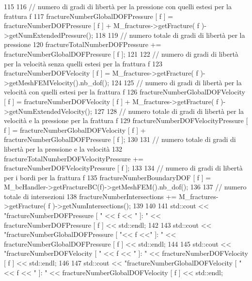 \begin{DoxyCode}
115         
116         \textcolor{comment}{// numero di gradi di libertà per la pressione con quelli estesi per la frattura f}
117         fractureNumberGlobalDOFPressure [ f ] = fractureNumberDOFPressure [ f ] + M\_fractures->getFracture(
       f )->getNumExtendedPressure();
118 
119         \textcolor{comment}{// numero totale di gradi di libertà per la pressione}
120         fractureTotalNumberDOFPressure += fractureNumberGlobalDOFPressure [ f ];
121 
122         \textcolor{comment}{// numero di gradi di libertà per la velocità senza quelli estesi per la frattura f}
123         fractureNumberDOFVelocity [ f ] = M\_fractures->getFracture( f )->getMeshFEMVelocity().nb\_dof();
124 
125         \textcolor{comment}{// numero di gradi di libertà per la velocità con quelli estesi per la frattura f}
126         fractureNumberGlobalDOFVelocity [ f ] = fractureNumberDOFVelocity [ f ] + M\_fractures->getFracture(
       f )->getNumExtendedVelocity();
127 
128         \textcolor{comment}{// numero totale di gradi di libertà per la velocità e la pressione per la frattura f}
129         fractureNumberDOFVelocityPressure [ f ] = fractureNumberGlobalDOFVelocity [ f ] + 
      fractureNumberGlobalDOFPressure [ f ];
130 
131         \textcolor{comment}{// numero totale di gradi di libertà per la pressione e la velocità}
132         fractureTotalNumberDOFVelocityPressure += fractureNumberDOFVelocityPressure [ f ];
133 
134         \textcolor{comment}{// numero di gradi di libertà per i bordi per la frattura f}
135         fractureNumberBoundaryDOF [ f ] = M\_bcHandler->getFractureBC(f)->getMeshFEM().nb\_dof();
136 
137         \textcolor{comment}{// numero totale di intersezioni}
138         fractureNumberIntersections += M\_fractures->getFracture( f )->getNumIntersections();
139 
140         
141         std::cout << \textcolor{stringliteral}{"fractureNumberDOFPressure [ "} << f << \textcolor{stringliteral}{" ]:  "} << fractureNumberDOFPressure [ f ] << 
      std::endl;
142         
143         std::cout << \textcolor{stringliteral}{"fractureNumberGlobalDOFPressure [ "}<< f <<\textcolor{stringliteral}{" ]:  "} << fractureNumberGlobalDOFPressure 
      [ f ] << std::endl;
144         
145         std::cout << \textcolor{stringliteral}{"fractureNumberDOFVelocity [ "} << f << \textcolor{stringliteral}{" ]:  "} << fractureNumberDOFVelocity [ f ] << 
      std::endl;
146         
147         std::cout << \textcolor{stringliteral}{"fractureNumberGlobalDOFVelocity [ "} << f << \textcolor{stringliteral}{" ]:  "} << 
      fractureNumberGlobalDOFVelocity [ f ] << std::endl;

\end{DoxyCode}
